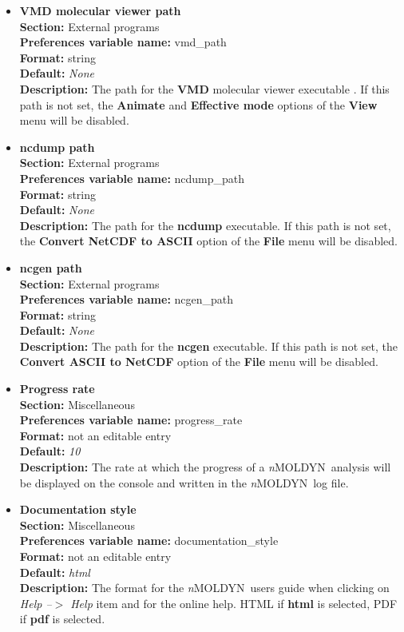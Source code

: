 \documentclass[a4paper,11pt]{report}
\newcommand{\NMOLDYN}{\textit{n}MOLDYN}
\begin{document}
\begin{itemize}
\item \textbf{VMD molecular viewer path}\\
\textbf{Section:} External programs\\
\textbf{Preferences variable name:} vmd\_path\\
\textbf{Format:} string\\
\textbf{Default:} \textit{None}\\
\textbf{Description:} The path for the \textbf{VMD} molecular viewer executable \cite{VMD}. If this path is not set, the 
\textbf{Animate} and \textbf{Effective mode} options of the \textbf{View}  menu will be disabled.
\newpage
\item \textbf{ncdump path}\\
\textbf{Section:} External programs\\
\textbf{Preferences variable name:} ncdump\_path\\
\textbf{Format:} string\\
\textbf{Default:} \textit{None}\\
\textbf{Description:} The path for the \textbf{ncdump} executable. If this path is not set, the 
\textbf{Convert NetCDF to ASCII} option of the \textbf{File} menu will be disabled.

\item \textbf{ncgen path}\\
\textbf{Section:} External programs\\
\textbf{Preferences variable name:} ncgen\_path\\
\textbf{Format:} string\\
\textbf{Default:} \textit{None}\\
\textbf{Description:} The path for the \textbf{ncgen} executable. 
If this path is not set, the \textbf{Convert ASCII to NetCDF} option of the \textbf{File} menu will be disabled.

\item \textbf{Progress rate}\\
\textbf{Section:} Miscellaneous\\
\textbf{Preferences variable name:} progress\_rate\\
\textbf{Format:} not an editable entry\\
\textbf{Default:} \textit{10}\\
\textbf{Description:} The rate at which the progress of a \NMOLDYN\ analysis will be displayed on the console and written 
in the \NMOLDYN\ log file.

\item \textbf{Documentation style}\\
\textbf{Section:} Miscellaneous\\
\textbf{Preferences variable name:} documentation\_style\\
\textbf{Format:} not an editable entry\\
\textbf{Default:} \textit{html}\\
\textbf{Description:} The format for the \NMOLDYN\ users guide when clicking on \textit{Help --$>$ Help} item and for the 
online help. HTML if \textbf{html} is selected, PDF if \textbf{pdf} is selected.


\end{itemize}
\end{document}
